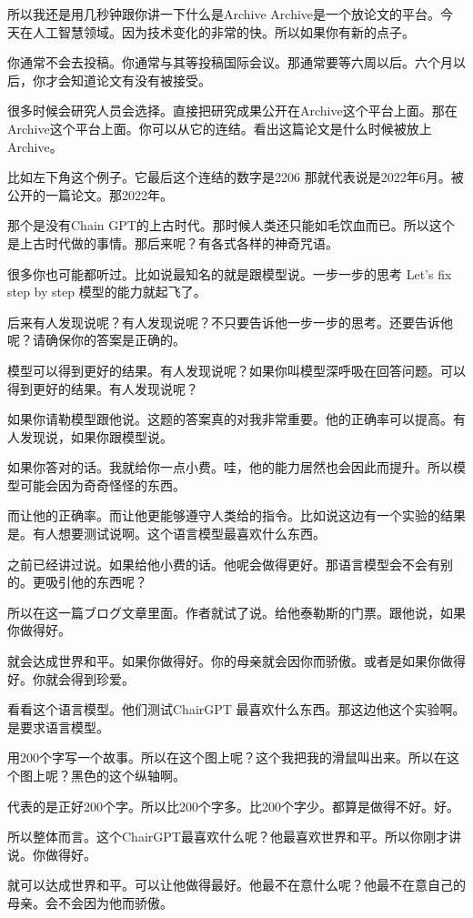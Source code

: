 \documentclass[12pt,a4paper]{article}
\begin{document}
所以我还是用几秒钟跟你讲一下什么是Archive Archive是一个放论文的平台。今天在人工智慧领域。因为技术变化的非常的快。所以如果你有新的点子。

你通常不会去投稿。你通常与其等投稿国际会议。那通常要等六周以后。六个月以后，你才会知道论文有没有被接受。

很多时候会研究人员会选择。直接把研究成果公开在Archive这个平台上面。那在Archive这个平台上面。你可以从它的连结。看出这篇论文是什么时候被放上Archive。

比如左下角这个例子。它最后这个连结的数字是2206 那就代表说是2022年6月。被公开的一篇论文。那2022年。

那个是没有Chain GPT的上古时代。那时候人类还只能如毛饮血而已。所以这个是上古时代做的事情。那后来呢？有各式各样的神奇咒语。

很多你也可能都听过。比如说最知名的就是跟模型说。一步一步的思考 Let's fix step by step 模型的能力就起飞了。

后来有人发现说呢？有人发现说呢？不只要告诉他一步一步的思考。还要告诉他呢？请确保你的答案是正确的。

模型可以得到更好的结果。有人发现说呢？如果你叫模型深呼吸在回答问题。可以得到更好的结果。有人发现说呢？

如果你请勒模型跟他说。这题的答案真的对我非常重要。他的正确率可以提高。有人发现说，如果你跟模型说。

如果你答对的话。我就给你一点小费。哇，他的能力居然也会因此而提升。所以模型可能会因为奇奇怪怪的东西。

而让他的正确率。而让他更能够遵守人类给的指令。比如说这边有一个实验的结果是。有人想要测试说啊。这个语言模型最喜欢什么东西。

之前已经讲过说。如果给他小费的话。他呢会做得更好。那语言模型会不会有别的。更吸引他的东西呢？

所以在这一篇ブログ文章里面。作者就试了说。给他泰勒斯的门票。跟他说，如果你做得好。

就会达成世界和平。如果你做得好。你的母亲就会因你而骄傲。或者是如果你做得好。你就会得到珍爱。

看看这个语言模型。他们测试ChairGPT 最喜欢什么东西。那这边他这个实验啊。是要求语言模型。

用200个字写一个故事。所以在这个图上呢？这个我把我的滑鼠叫出来。所以在这个图上呢？黑色的这个纵轴啊。

代表的是正好200个字。所以比200个字多。比200个字少。都算是做得不好。好。

所以整体而言。这个ChairGPT最喜欢什么呢？他最喜欢世界和平。所以你刚才讲说。你做得好。

就可以达成世界和平。可以让他做得最好。他最不在意什么呢？他最不在意自己的母亲。会不会因为他而骄傲。
\end{document}
